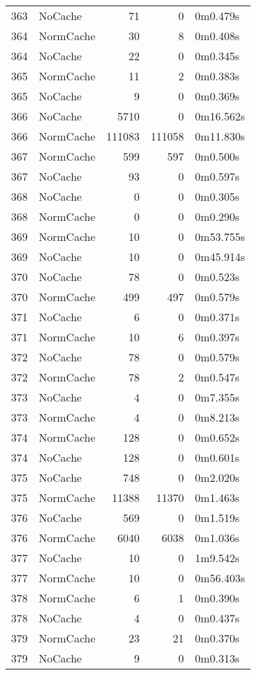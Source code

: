 \begin{tabular}{llrrl}
363 & NoCache & 71 & 0 & 0m0.479s \\
364 & NormCache & 30 & 8 & 0m0.408s \\
364 & NoCache & 22 & 0 & 0m0.345s \\
365 & NormCache & 11 & 2 & 0m0.383s \\
365 & NoCache & 9 & 0 & 0m0.369s \\
366 & NoCache & 5710 & 0 & 0m16.562s \\
366 & NormCache & 111083 & 111058 & 0m11.830s \\
367 & NormCache & 599 & 597 & 0m0.500s \\
367 & NoCache & 93 & 0 & 0m0.597s \\
368 & NoCache & 0 & 0 & 0m0.305s \\
368 & NormCache & 0 & 0 & 0m0.290s \\
369 & NormCache & 10 & 0 & 0m53.755s \\
369 & NoCache & 10 & 0 & 0m45.914s \\
370 & NoCache & 78 & 0 & 0m0.523s \\
370 & NormCache & 499 & 497 & 0m0.579s \\
371 & NoCache & 6 & 0 & 0m0.371s \\
371 & NormCache & 10 & 6 & 0m0.397s \\
372 & NoCache & 78 & 0 & 0m0.579s \\
372 & NormCache & 78 & 2 & 0m0.547s \\
373 & NoCache & 4 & 0 & 0m7.355s \\
373 & NormCache & 4 & 0 & 0m8.213s \\
374 & NormCache & 128 & 0 & 0m0.652s \\
374 & NoCache & 128 & 0 & 0m0.601s \\
375 & NoCache & 748 & 0 & 0m2.020s \\
375 & NormCache & 11388 & 11370 & 0m1.463s \\
376 & NoCache & 569 & 0 & 0m1.519s \\
376 & NormCache & 6040 & 6038 & 0m1.036s \\
377 & NoCache & 10 & 0 & 1m9.542s \\
377 & NormCache & 10 & 0 & 0m56.403s \\
378 & NormCache & 6 & 1 & 0m0.390s \\
378 & NoCache & 4 & 0 & 0m0.437s \\
379 & NormCache & 23 & 21 & 0m0.370s \\
379 & NoCache & 9 & 0 & 0m0.313s \\

\end{tabular}
